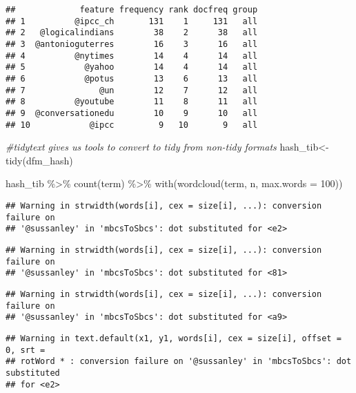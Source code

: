 \documentclass[
]{article}
\newenvironment{Shaded}{\begin{snugshade}}{\end{snugshade}}
\newcommand{\AttributeTok}[1]{\textcolor[rgb]{0.77,0.63,0.00}{#1}}
\newcommand{\CommentTok}[1]{\textcolor[rgb]{0.56,0.35,0.01}{\textit{#1}}}
\newcommand{\DecValTok}[1]{\textcolor[rgb]{0.00,0.00,0.81}{#1}}
\newcommand{\FunctionTok}[1]{\textcolor[rgb]{0.00,0.00,0.00}{#1}}
\newcommand{\NormalTok}[1]{#1}
\newcommand{\OtherTok}[1]{\textcolor[rgb]{0.56,0.35,0.01}{#1}}
\newcommand{\SpecialCharTok}[1]{\textcolor[rgb]{0.00,0.00,0.00}{#1}}
\begin{document}
\begin{verbatim}
##             feature frequency rank docfreq group
## 1          @ipcc_ch       131    1     131   all
## 2   @logicalindians        38    2      38   all
## 3  @antonioguterres        16    3      16   all
## 4          @nytimes        14    4      14   all
## 5            @yahoo        14    4      14   all
## 6            @potus        13    6      13   all
## 7               @un        12    7      12   all
## 8          @youtube        11    8      11   all
## 9  @conversationedu        10    9      10   all
## 10            @ipcc         9   10       9   all
\end{verbatim}

\begin{Shaded}
\begin{Highlighting}[]
\CommentTok{\#tidytext gives us tools to convert to tidy from non{-}tidy formats}
\NormalTok{hash\_tib}\OtherTok{\textless{}{-}} \FunctionTok{tidy}\NormalTok{(dfm\_hash)}

\NormalTok{hash\_tib }\SpecialCharTok{\%\textgreater{}\%}
   \FunctionTok{count}\NormalTok{(term) }\SpecialCharTok{\%\textgreater{}\%}
   \FunctionTok{with}\NormalTok{(}\FunctionTok{wordcloud}\NormalTok{(term, n, }\AttributeTok{max.words =} \DecValTok{100}\NormalTok{))}
\end{Highlighting}
\end{Shaded}

\begin{verbatim}
## Warning in strwidth(words[i], cex = size[i], ...): conversion failure on
## '@sussanley⁩' in 'mbcsToSbcs': dot substituted for <e2>
\end{verbatim}

\begin{verbatim}
## Warning in strwidth(words[i], cex = size[i], ...): conversion failure on
## '@sussanley⁩' in 'mbcsToSbcs': dot substituted for <81>
\end{verbatim}

\begin{verbatim}
## Warning in strwidth(words[i], cex = size[i], ...): conversion failure on
## '@sussanley⁩' in 'mbcsToSbcs': dot substituted for <a9>
\end{verbatim}

\begin{verbatim}
## Warning in text.default(x1, y1, words[i], cex = size[i], offset = 0, srt =
## rotWord * : conversion failure on '@sussanley⁩' in 'mbcsToSbcs': dot substituted
## for <e2>
\end{verbatim}
\end{document}
